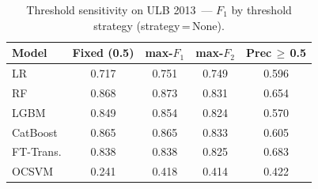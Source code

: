 \begin{table}[ht!]
\centering
\caption{Threshold sensitivity on ULB 2013~--- $F_1$ by threshold strategy (strategy\,=\,None).}
\label{tab:threshold_ulb_f1}
\begin{tabular}{l c c c c}
\toprule
Model & Fixed (0.5) & max-$F_1$ & max-$F_2$ & Prec\,$\geq$\,0.5 \\
\midrule
LR         & 0.717 & 0.751 & 0.749 & 0.596 \\
RF         & 0.868 & 0.873 & 0.831 & 0.654 \\
LGBM       & 0.849 & 0.854 & 0.824 & 0.570 \\
CatBoost   & 0.865 & 0.865 & 0.833 & 0.605 \\
FT-Trans.  & 0.838 & 0.838 & 0.825 & 0.683 \\
OCSVM      & 0.241 & 0.418 & 0.414 & 0.422 \\
\bottomrule
\end{tabular}
\end{table}
